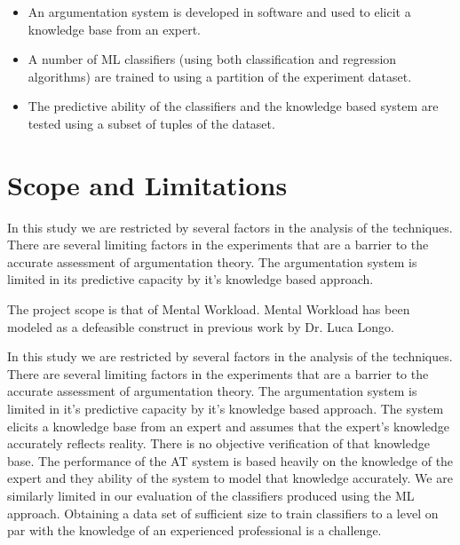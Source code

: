 \begin{itemize}

  \item An argumentation system is developed in software and used to elicit a knowledge base from an expert.
  \item A number of ML classifiers (using both classification and regression algorithms) are trained to using a partition of the experiment dataset.
  \item The predictive ability of the classifiers and the knowledge based system are tested using a subset of tuples of the dataset.

\end{itemize}



\section{Scope and Limitations}


In this study we are restricted by several factors in the analysis of the techniques. There are several limiting factors in the experiments that are a barrier to the accurate assessment of argumentation theory. The argumentation system is limited in its predictive capacity by it’s knowledge based approach.

The project scope is that of Mental Workload. Mental Workload has been modeled as a defeasible construct in previous work by Dr. Luca Longo. 


In this study we are restricted by several factors in the analysis of the techniques.
There are several limiting factors in the experiments that are a barrier to the accurate assessment of argumentation theory.
The argumentation system is limited in it's predictive capacity by it's knowledge based approach.
The system elicits a knowledge base from an expert and assumes that the expert's knowledge accurately reflects reality.
There is no objective verification of that knowledge base. The performance of the AT system is based heavily on the knowledge of the expert and they ability of the system to model that knowledge accurately.
We are similarly limited in our evaluation of the classifiers produced using the ML approach.
Obtaining a data set of sufficient size to train classifiers to a level on par with the knowledge of an experienced professional is a challenge.

